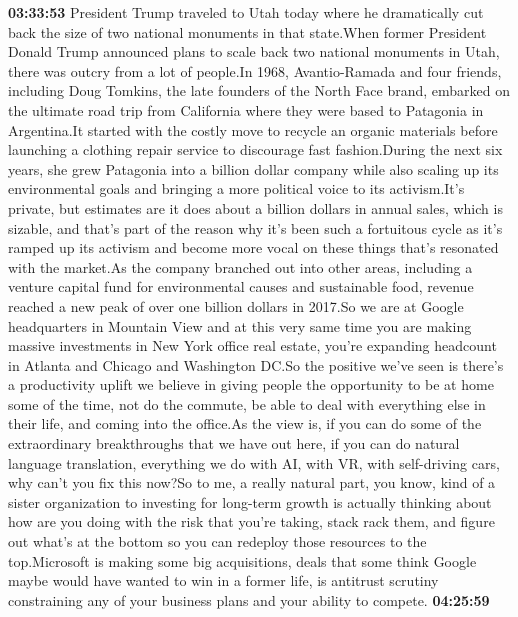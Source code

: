 \documentclass{article}%
\begin{document}
\textbf{03:33:53}%
\newline%
President Trump traveled to Utah today where he dramatically cut back the size of two national monuments in that state.When former President Donald Trump announced plans to scale back two national monuments in Utah, there was outcry from a lot of people.In 1968, Avantio{-}Ramada and four friends, including Doug Tomkins, the late founders of the North Face brand, embarked on the ultimate road trip from California where they were based to Patagonia in Argentina.It started with the costly move to recycle an organic materials before launching a clothing repair service to discourage fast fashion.During the next six years, she grew Patagonia into a billion dollar company while also scaling up its environmental goals and bringing a more political voice to its activism.It's private, but estimates are it does about a billion dollars in annual sales, which is sizable, and that's part of the reason why it's been such a fortuitous cycle as it's ramped up its activism and become more vocal on these things that's resonated with the market.As the company branched out into other areas, including a venture capital fund for environmental causes and sustainable food, revenue reached a new peak of over one billion dollars in 2017.So we are at Google headquarters in Mountain View and at this very same time you are making massive investments in New York office real estate, you're expanding headcount in Atlanta and Chicago and Washington DC.So the positive we've seen is there's a productivity uplift we believe in giving people the opportunity to be at home some of the time, not do the commute, be able to deal with everything else in their life, and coming into the office.As the view is, if you can do some of the extraordinary breakthroughs that we have out here, if you can do natural language translation, everything we do with AI, with VR, with self{-}driving cars, why can't you fix this now?So to me, a really natural part, you know, kind of a sister organization to investing for long{-}term growth is actually thinking about how are you doing with the risk that you're taking, stack rack them, and figure out what's at the bottom so you can redeploy those resources to the top.Microsoft is making some big acquisitions, deals that some think Google maybe would have wanted to win in a former life, is antitrust scrutiny constraining any of your business plans and your ability to compete.%
\textbf{04:25:59}%
\newline%
\end{document}
